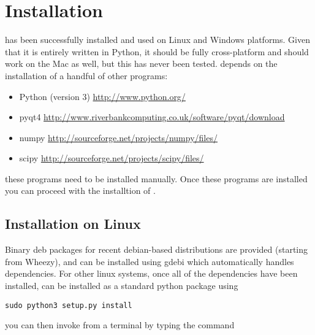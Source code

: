 \documentclass[a4paper,12pt,english]{sphinxmanual}
\begin{document}
\chapter{Installation}
\label{installation:sec-installation}\label{installation:installation}\label{installation::doc}
 has been successfully installed and used on Linux and
Windows platforms. Given that it is entirely written in Python, it should be
fully cross-platform and should work on the Mac as well, but this has
never been tested.  depends on the installation of a
handful of other programs:
\begin{itemize}
\item {} 
Python (version 3) \href{http://www.python.org/}{http://www.python.org/}

\item {} 
pyqt4
\href{http://www.riverbankcomputing.co.uk/software/pyqt/download}{http://www.riverbankcomputing.co.uk/software/pyqt/download}

\item {} 
numpy
\href{http://sourceforge.net/projects/numpy/files/}{http://sourceforge.net/projects/numpy/files/}

\item {} 
scipy
\href{http://sourceforge.net/projects/scipy/files/}{http://sourceforge.net/projects/scipy/files/}

\end{itemize}

these programs need to be installed manually. Once these programs are
installed you can proceed with the installtion of .


\section{Installation on Linux}
\label{installation:installation-on-linux}
Binary deb packages for recent debian-based distributions are provided
(starting from Wheezy), and can be installed using gdebi which
automatically handles dependencies. For other linux systems, once all of
the dependencies have been installed,  can be
installed as a standard python package using

\begin{Verbatim}[commandchars=\\\{\}]
sudo python3 setup.py install
\end{Verbatim}

you can then invoke  from a terminal by typing the
command
\end{document}
